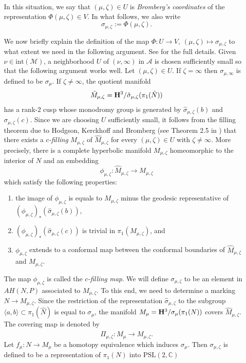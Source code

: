 \documentclass[12pt]{article}
\theoremstyle{plain}
\theoremstyle{definition}
\theoremstyle{remark}
\newcommand{\HH}{{\bf H}}
\newcommand{\M}{\mathcal M}
\newcommand{\A}{\mathcal A}
\newcommand{\hN}{{\hat N}}
\newcommand{\fty}{\infty}
\newcommand{\la}{\langle}
\newcommand{\ra}{\rangle}
\newcommand{\ze}{\zeta}
\newcommand{\inte}{\mathrm{int}}
\newcommand{\psl}{{\mathrm{PSL}}(2,\mathbb C)}
\newcommand{\mz}{{\mu,\ze}}
\begin{document}
In this situation, we say that $(\mu,\ze) \in U$ is  {\it Bromberg's coordinates} of 
the representation 
$\Phi(\mu,\ze) \in V$. 
In what follows, we also write  
$$
\sigma_{\mu,\ze}:=\Phi(\mu,\ze). 
$$

We now briefly explain the definition of the map $\Phi:U \to V, \ (\mu,\ze) \mapsto \sigma_{\mu,\ze}$ 
to what extent we need in the following argument. 
See \cite{Br} for the full details.  
Given $\nu \in \inte(\M)$, a neighborhood $U$ of  $(\nu,\fty)$ in $\A$ 
is chosen sufficiently small so that the following argument works well.  
Let $(\mu,\ze) \in U$. 
If $\ze=\fty$ then $\sigma_{\mu,\fty}
$ is defined to be $\sigma_\mu$. 
If $\ze \ne \fty$, the quotient manifold 
$$
\hat M_{\mu,\ze}=\HH^3/\hat \sigma_{\mu,\ze}(\pi_1(\hN)) 
$$ 
has a rank-$2$ cusp whose monodromy group is  
generated by $\hat \sigma_\mz(b)$ and $\hat \sigma_\mz(c)$.   
Since we are choosing $U$ sufficiently small, it follows from 
the filling theorem due to Hodgson, Kerckhoff and Bromberg (see Theorem 2.5 in \cite{Br}) that 
there exists a  {\it $c$-filling} $M_\mz$ of $\hat M_\mz$ 
for every $(\mu,\ze) \in U$ with $\ze \ne \fty$. 
More precisely,  
there is a complete hyperbolic manifold $M_\mz$ homeomorphic to the interior of $N$ 
and an embedding 
$$
\phi_{\mu,\ze}:\hat M_{\mu,\ze} \to M_{\mu,\ze}
$$
which satisfy the following properties: 
\begin{enumerate}
\item  
the image of $\phi_{\mu,\ze}$ is equals to $M_{\mu,\ze}$ minus 
the geodesic representative of 
$(\phi_{\mu,\ze})_*(\hat \sigma_\mz(b))$, 
\item 
$(\phi_{\mu,\ze})_*(\hat \sigma_\mz(c))$ is trivial in $\pi_1(M_\mz)$, 
and  
\item 
$\phi_\mz$ extends to a conformal map between the conformal boundaries 
of $\hat M_\mz$ and $M_\mz$. 
\end{enumerate}
%
The map $\phi_{\mu,\ze}$ is called the {\it $c$-filling map}. 
We will define $\sigma_{\mu,\ze}$ to be an element in $AH(N,P)$ associated to $M_{\mu,\ze}$. 
To this end, we need to determine a marking $N \to M_{\mu,\ze}$. 
Since the restriction of the representation $\hat \sigma_{\mu,\ze}$ 
to the subgroup $\la a,b\ra \subset \pi_1(\hN)$ is equal to $\sigma_\mu$,  
the manifold $M_\mu=\HH^3/\sigma_\mu(\pi_1(N))$ covers $\hat M_{\mu,\ze}$. 
The covering map is denoted by 
$$\Pi_{\mu,\ze}:M_\mu \to \hat M_{\mu,\ze}.
$$ 
Let $f_\mu:N \to M_\mu$ be a homotopy equivalence which induces $\sigma_\mu$. 
Then $\sigma_{\mu,\ze}$ 
is defined to be a representation of $\pi_1(N)$ into $\psl$ 
\end{document}
